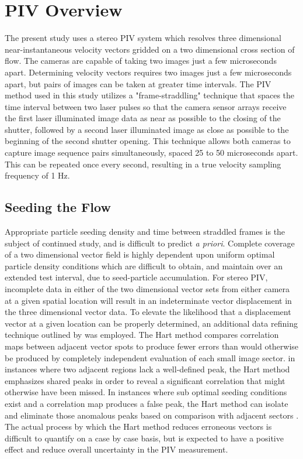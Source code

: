 
\section{PIV Overview}

The present study uses a stereo PIV system which resolves three dimensional 
near-instantaneous velocity vectors gridded on a two dimensional cross section 
of flow. The cameras are capable of taking two images just a few microseconds 
apart. Determining velocity vectors requires two images just a few 
microseconds apart, but pairs of images can be taken at greater time intervals. 
The PIV method used in this study utilizes a "frame-straddling" technique that 
spaces the time interval between two laser pulses so that the camera sensor 
arrays receive the first laser illuminated image data as near as possible to 
the closing of the shutter, followed by a second laser illuminated image as 
close as possible to the beginning of the second shutter opening. This 
technique allows both cameras to capture image sequence pairs simultaneously, 
spaced 25 to 50 microseconds apart. This can be repeated once every second, 
resulting in a true velocity sampling frequency of 1 Hz.

\subsection{Seeding the Flow}

Appropriate particle seeding density and time between straddled frames is the
subject of continued study, and is difficult to predict \textit{a priori}. 
Complete coverage of a two dimensional vector field is highly dependent upon 
uniform optimal particle density conditions which are difficult to obtain, and 
maintain over an extended test interval, due to seed-particle accumulation. For 
stereo PIV, incomplete data in either of the two dimensional vector 
sets from either camera at a given spatial location will result in an 
indeterminate vector displacement in the three dimensional vector data. To 
elevate the likelihood that a displacement vector at a given location can be 
properly determined, an additional data refining technique outlined by 
\cite{hart1998} was employed. The Hart method compares correlation maps 
between adjacent vector spots to produce fewer errors than would otherwise be 
produced by completely independent evaluation of each small image sector. in 
instances where two adjacent regions lack a well-defined peak, the Hart method 
emphasizes shared 
peaks in order to reveal a significant correlation that might otherwise have 
been missed. In instances 
where sub optimal seeding conditions exist and a correlation map 
produces a false peak, the Hart method can isolate and eliminate those 
anomalous peaks based on comparison with adjacent sectors \cite{hart1998}. The 
actual process by which the Hart method reduces erroneous vectors is difficult 
to quantify on a case by case basis, but is expected to have a positive effect 
and reduce overall uncertainty in the PIV measurement.